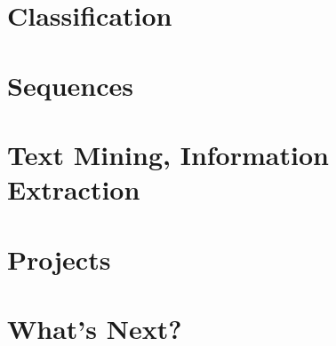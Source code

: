 \section[Class]{Classification}


\section[Seq]{Sequences}



\section[IR]{Text Mining, Information Extraction}
 

\section[Prj]{Projects}
%  

\section[Next]{What's Next?}



% 

